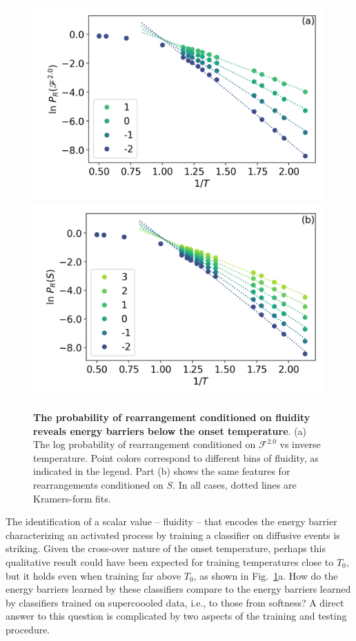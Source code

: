 \documentclass[aps,reprint,superscriptaddress,nofootinbib, notitlepage,prl]{revtex4-2}
\begin{document}
\begin{figure}[t!]
    \centering
    \includegraphics[width =1.0\linewidth]{Figure_3a.png}
    \includegraphics[width =1.0\linewidth]{Figure_3b.png}
    \caption{\textbf{The probability of rearrangement conditioned on fluidity reveals energy barriers below the onset temperature}. (a) The log probability of rearrangement conditioned on $\mathcal{F}^{2.0}$ vs inverse temperature. Point colors correspond to different bins of fluidity, as indicated in the legend. Part (b) shows the same features for rearrangements conditioned on $S$. In all cases, dotted lines are Kramers-form fits.}
    \label{fig:physicalInterpretationOfClassifiers}
\end{figure}

The identification of a scalar value -- fluidity -- that encodes the energy barrier characterizing an activated process  by training a classifier on diffusive events is striking. Given the cross-over nature of the onset temperature, perhaps this qualitative result could have been expected for training temperatures close to $T_0$, but it holds even when training far above $T_0$, as shown in Fig.~\ref{fig:physicalInterpretationOfClassifiers}a. How do the energy barriers learned by these classifiers compare to the energy barriers learned by classifiers trained on supercoooled data, i.e., to those from softness? A direct answer to this question is complicated by two aspects of the training and testing procedure. 
\end{document}
